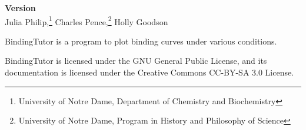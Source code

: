 \thispagestyle{empty}
\noindent{}

\begin{center}
	\Large \sffamily
	\vspace{0.5in} \par \textbf{Version \btversion} \\[1.5em]
	
	Julia Philip,\footnote{University of Notre Dame, Department of Chemistry and Biochemistry}
	Charles Pence,\footnote{University of Notre Dame, Program in History and Philosophy of Science}
	Holly Goodson\footnotemark[1]
	\vspace{1in}
\end{center} \par

BindingTutor is a program to plot binding curves under various conditions.

BindingTutor is licensed under the GNU General Public License, and its documentation is licensed under the Creative Commons CC-BY-SA 3.0 License.
